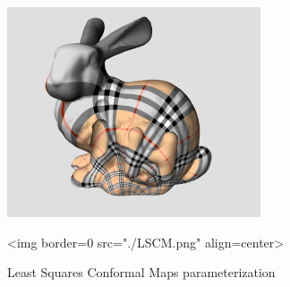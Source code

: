 \begin{figure}[bht]
    \begin{center}
        \begin{ccTexOnly}
            \includegraphics{Parameterization/LSCM} %
        \end{ccTexOnly}
        \begin{ccHtmlOnly}
            <img border=0 src="./LSCM.png" align=center>
        \end{ccHtmlOnly}
        \label{parameterization-fig-LSCM}

        \caption{Least Squares Conformal Maps parameterization}
    \end{center}
\end{figure}


